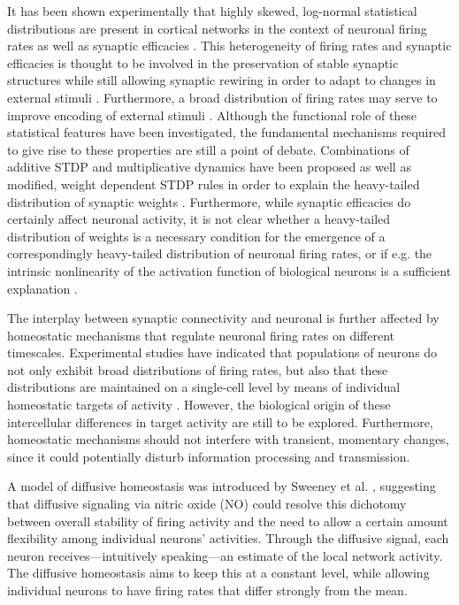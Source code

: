 \documentclass[10pt,letterpaper]{article}
\begin{document}
It has been shown experimentally that highly skewed, log-normal statistical distributions are present in cortical networks in the context of neuronal firing rates \cite{Battaglia_2005,Mizuseki_2013} as well as synaptic efficacies \cite{Song_Connectivity_2005, Lefort_2009}. 
This heterogeneity of firing rates and synaptic efficacies is thought to be involved in the preservation of stable synaptic structures while still allowing synaptic rewiring in order to adapt to changes in external stimuli \cite{Buzsaki_2004, Buzsaki_Fir_Rates_2014}. Furthermore, a broad distribution of firing rates may serve to improve encoding of external stimuli \cite{Marsat_2010}. Although the functional role of these statistical features have been investigated, the fundamental mechanisms required to give rise to these properties are still a point of debate. Combinations of additive STDP and multiplicative dynamics have been proposed as well as modified, weight dependent STDP rules in order to explain the heavy-tailed distribution of synaptic weights \cite{Statman_Synapses_2014,Gilson_2011}. Furthermore, while synaptic efficacies do certainly affect neuronal activity, it is not clear whether a heavy-tailed distribution of weights is a necessary condition for the emergence of a correspondingly heavy-tailed distribution of neuronal firing rates, or if e.g. the intrinsic nonlinearity of the activation function of biological neurons is a sufficient explanation \cite{Koulakov_2009, Roxin_Firing_Rate_Distribution}. 

The interplay between synaptic connectivity and neuronal is further affected by homeostatic mechanisms that regulate neuronal firing rates on different timescales. Experimental studies have indicated that populations of neurons do not only exhibit broad distributions of firing rates, but also that these distributions are maintained on a single-cell level by means of individual homeostatic targets of activity \cite{Mizuseki_2013,Hengen_2016}. However, the biological origin of these intercellular differences in target activity are still to be explored. Furthermore, homeostatic mechanisms should not interfere with transient, momentary changes, since it could potentially disturb information processing and transmission. 

A model of diffusive homeostasis was introduced by Sweeney et al. \cite{Sweeney_Paper}, suggesting that diffusive signaling via nitric oxide (NO) could resolve this dichotomy between overall stability of firing activity and the need to allow a certain amount flexibility among individual neurons’ activities. Through the diffusive signal, each neuron receives---intuitively speaking---an estimate of the local network activity. The diffusive homeostasis aims to keep this at a constant level, while allowing individual neurons to have firing rates that differ strongly from the mean. 
\end{document}
